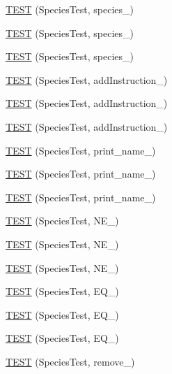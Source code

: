 \begin{DoxyCompactItemize}
\item 
\hyperlink{TestDarwin_8c_09_09_a71cb4fd055a1875cdd089fa57df3c14d}{T\-E\-S\-T} (Species\-Test, species\-\_)
\item 
\hyperlink{TestDarwin_8c_09_09_ac2141708b017569c504d28a8c3344903}{T\-E\-S\-T} (Species\-Test, species\-\_)
\item 
\hyperlink{TestDarwin_8c_09_09_a2c7f310e729b61d46a441a489c0ead78}{T\-E\-S\-T} (Species\-Test, species\-\_)
\item 
\hyperlink{TestDarwin_8c_09_09_a8d4ed3ff17cae81830e4f956e8904a19}{T\-E\-S\-T} (Species\-Test, add\-Instruction\-\_)
\item 
\hyperlink{TestDarwin_8c_09_09_aafb9ddabac184966e0985a4d94fe6707}{T\-E\-S\-T} (Species\-Test, add\-Instruction\-\_)
\item 
\hyperlink{TestDarwin_8c_09_09_afcd061e11103b0c070a17a809efa0075}{T\-E\-S\-T} (Species\-Test, add\-Instruction\-\_)
\item 
\hyperlink{TestDarwin_8c_09_09_ab6768b793478c13e8b21b86bca6d520a}{T\-E\-S\-T} (Species\-Test, print\-\_\-name\-\_)
\item 
\hyperlink{TestDarwin_8c_09_09_a159623aed45e38c80d783273e786c62f}{T\-E\-S\-T} (Species\-Test, print\-\_\-name\-\_)
\item 
\hyperlink{TestDarwin_8c_09_09_a5290d47b7691a91e8a5592ce875e72ea}{T\-E\-S\-T} (Species\-Test, print\-\_\-name\-\_)
\item 
\hyperlink{TestDarwin_8c_09_09_a99067b451f40c79f88f0add229cbadd2}{T\-E\-S\-T} (Species\-Test, N\-E\-\_)
\item 
\hyperlink{TestDarwin_8c_09_09_a3d5a2b2903301227f3352599c9880a29}{T\-E\-S\-T} (Species\-Test, N\-E\-\_)
\item 
\hyperlink{TestDarwin_8c_09_09_af6fa680753772eb01460171ddd521935}{T\-E\-S\-T} (Species\-Test, N\-E\-\_)
\item 
\hyperlink{TestDarwin_8c_09_09_a0cb5eba153118142a19cf7aad2864841}{T\-E\-S\-T} (Species\-Test, E\-Q\-\_)
\item 
\hyperlink{TestDarwin_8c_09_09_a814f9b164b1d532a0d13c5398a7c9c97}{T\-E\-S\-T} (Species\-Test, E\-Q\-\_)
\item 
\hyperlink{TestDarwin_8c_09_09_a29f4e12363a4eed0da2c50a31398e6cf}{T\-E\-S\-T} (Species\-Test, E\-Q\-\_)
\item 
\hyperlink{TestDarwin_8c_09_09_a8e0f737084441c1aa16b2582f1f4176d}{T\-E\-S\-T} (Species\-Test, remove\-\_)

\end{DoxyCompactItemize}
